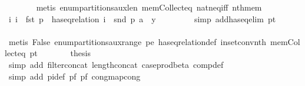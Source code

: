 \begin{isabellebody}
\ \ \ \ \ \ \isamarkupfalse%
\ {\isacharparenleft}{\kern0pt}metis\ enum{\isacharunderscore}{\kern0pt}partitions{\isacharunderscore}{\kern0pt}aux{\isacharunderscore}{\kern0pt}len\ mem{\isacharunderscore}{\kern0pt}Collect{\isacharunderscore}{\kern0pt}eq\ nat{\isacharunderscore}{\kern0pt}neq{\isacharunderscore}{\kern0pt}iff\ nth{\isacharunderscore}{\kern0pt}mem{\isacharparenright}{\kern0pt}\isanewline
\ \ \ \ \isamarkupfalse%
\ \isamarkupfalse%
\ {\isachardoublequoteopen}{\isasymAnd}i{\isachardot}{\kern0pt}\ i\ {\isacharless}{\kern0pt}\ fst\ p{}\ {\isasymLongrightarrow}\ {\isasymnot}{\isacharparenleft}{\kern0pt}has{\isacharunderscore}{\kern0pt}eq{\isacharunderscore}{\kern0pt}relation\ {\isacharparenleft}{\kern0pt}i\ {\isacharhash}{\kern0pt}\ snd\ p{}{\isacharparenright}{\kern0pt}\ {\isacharparenleft}{\kern0pt}a\ {\isacharhash}{\kern0pt}\ y{\isacharparenright}{\kern0pt}{\isacharparenright}{\kern0pt}{\isachardoublequoteclose}\ \isanewline
\ \ \ \ \ \ \isamarkupfalse%
\ {\isacharparenleft}{\kern0pt}simp\ add{\isacharcolon}{\kern0pt}has{\isacharunderscore}{\kern0pt}eq{\isacharunderscore}{\kern0pt}elim\ p{}{\isacharunderscore}{\kern0pt}t{\isacharparenright}{\kern0pt}\isanewline
\ \ \ \ \ \ \isamarkupfalse%
\ {\isacharparenleft}{\kern0pt}metis\ False\ enum{\isacharunderscore}{\kern0pt}partitions{\isacharunderscore}{\kern0pt}aux{\isacharunderscore}{\kern0pt}range\ p{}{\isacharunderscore}{\kern0pt}e\ has{\isacharunderscore}{\kern0pt}eq{\isacharunderscore}{\kern0pt}relation{\isacharunderscore}{\kern0pt}def\ in{\isacharunderscore}{\kern0pt}set{\isacharunderscore}{\kern0pt}conv{\isacharunderscore}{\kern0pt}nth\ mem{\isacharunderscore}{\kern0pt}Collect{\isacharunderscore}{\kern0pt}eq\ p{}{\isacharunderscore}{\kern0pt}t{\isacharparenright}{\kern0pt}\isanewline
\ \ \ \ \isamarkupfalse%
\ \isamarkupfalse%
\ {\isacharquery}{\kern0pt}thesis\isanewline
\ \ \ \ \ \ \isamarkupfalse%
\ {\isacharparenleft}{\kern0pt}simp\ add{\isacharcolon}{\kern0pt}\ filter{\isacharunderscore}{\kern0pt}concat\ length{\isacharunderscore}{\kern0pt}concat\ case{\isacharunderscore}{\kern0pt}prod{\isacharunderscore}{\kern0pt}beta{\isacharprime}{\kern0pt}\ comp{\isacharunderscore}{\kern0pt}def{\isacharparenright}{\kern0pt}\isanewline
\ \ \ \ \ \ \isamarkupfalse%
\ {\isacharparenleft}{\kern0pt}simp\ add{\isacharcolon}{\kern0pt}\ pi{\isacharunderscore}{\kern0pt}def\ p{}{\isacharunderscore}{\kern0pt}f\ p{}{\isacharunderscore}{\kern0pt}f\ cong{\isacharcolon}{\kern0pt}map{\isacharunderscore}{\kern0pt}cong{\isacharparenright}{\kern0pt}\isanewline

\end{isabellebody}
